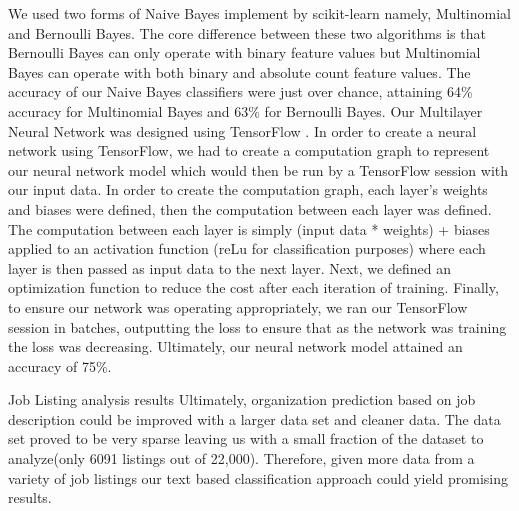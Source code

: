 We used two forms of Naive Bayes implement by scikit-learn namely, Multinomial and Bernoulli Bayes. The core difference between these two algorithms is that Bernoulli Bayes can only operate with binary feature values but Multinomial Bayes can operate with both binary and absolute count feature values. 
The accuracy of our Naive Bayes classifiers were just over chance, attaining 64\% accuracy for Multinomial Bayes and 63\% for Bernoulli Bayes. 
Our Multilayer Neural Network was designed using TensorFlow \cite{tensorFlow}. In order to create a neural network using TensorFlow, we had to create a computation graph to represent our neural network model which would then be run by a TensorFlow session with our input data. In order to create the computation graph, each layer’s weights and biases were defined, then the computation between each layer was defined. The computation between each layer is simply (input data * weights) + biases applied to an activation function (reLu for classification purposes) where each layer is then passed as input data to the next layer. Next, we defined an optimization function to reduce the cost after each iteration of training. Finally, to ensure our network was operating appropriately, we ran our TensorFlow session in batches, outputting the loss to ensure that as the network was training the loss was decreasing. Ultimately, our neural network model attained an accuracy of 75\%.

Job Listing analysis results
Ultimately, organization prediction based on job description could be improved with a larger data set and cleaner data. The data set proved to be very sparse leaving us with a small fraction of the dataset to analyze(only 6091 listings out of 22,000). Therefore, given more data from a variety of job listings our text based classification approach could yield promising results.

